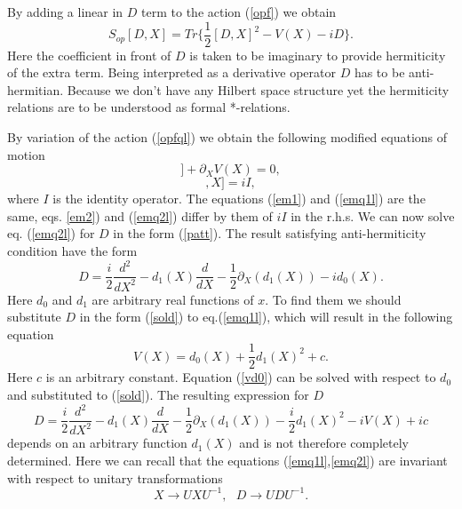 \documentclass[a4paper,11pt]{article}
\begin{document}
By adding a linear in $D$ term to the action (\ref{opf}) we obtain
\begin{equation}
S_{op}[D,X]=Tr \Big\{ \frac{1}{2}[D,X]^2 - V(X)-iD    \Big\}.
\label{opfql}
\end{equation}
Here the coefficient in front of $D$ is taken to be imaginary to
provide hermiticity of the extra term. Being interpreted as a
derivative operator $D$ has to be anti-hermitian. Because we don't
have any Hilbert space structure yet the hermiticity relations are
to be understood as formal *-relations.

By variation of the action (\ref{opfql}) we obtain the following
modified equations of motion
\begin{equation}
[D,[D,X]] + \partial_X V(X)=0, \label{emq1l}
\end{equation}
\begin{equation}
[[D,X],X]=iI, \label{emq2l}
\end{equation}
where $I$ is the identity operator. The equations (\ref{em1}) and
(\ref{emq1l}) are the same, eqs. \ref{em2}) and (\ref{emq2l})
differ by them of $iI$ in the r.h.s. We can now solve eq.
(\ref{emq2l}) for $D$ in the form (\ref{patt}). The result
satisfying anti-hermiticity condition have the form
\begin{equation}
D=\frac{i}{2}\frac{d^2}{dX^2}-d_1(X)\frac{d}{dX}-\frac{1}{2}\partial_X
(d_1(X))-i d_0(X). \label{sold}
\end{equation}
Here $d_0$ and $d_1$ are arbitrary real functions of $x$. To find
them we should substitute $D$ in the form (\ref{sold}) to
eq.(\ref{emq1l}), which will result in the following equation
\begin{equation}
V(X)=d_0(X)+\frac{1}{2}d_1(X)^2+c. \label{vd0}
\end{equation}
Here $c$ is an arbitrary constant. Equation (\ref{vd0}) can be
solved with respect to $d_0$ and substituted to (\ref{sold}). The
resulting expression for $D$
\begin{equation}
D=\frac{i}{2}\frac{d^2}{dX^2}-d_1(X)\frac{d}{dX}-\frac{1}{2}\partial_X
(d_1(X))-\frac{i}{2}d_1(X)^2- i V(X)+ic \label{sold1}
\end{equation}
depends on an arbitrary function $d_1(X)$ and is not therefore
completely determined. Here we can recall that the equations
(\ref{emq1l},\ref{emq2l}) are invariant with respect to unitary
transformations
\begin{equation}
X\rightarrow UXU^{-1}, \ \ \ D \rightarrow UDU^{-1}. \label{untr0}
\end{equation}
\end{document}
